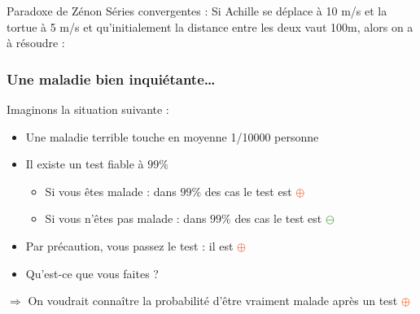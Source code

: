 \documentclass[usenames, dvipsnames]{beamer}
\newcommand{\positif}{\textcolor{OrangeRed}{$\oplus$} }
\newcommand{\negatif}{\textcolor{ForestGreen}{$\ominus$} }
\begin{document}
\begin{frame}[plain]{Paradoxe de Zénon}
{Séries convergentes :}
Si Achille se déplace à 10 m/s et la tortue à 5 m/s et qu'initialement la distance entre les deux vaut 100m, alors on a à résoudre : 
{} %
{}
\end{frame}

\begin{frame}[plain]
\frametitle{Une maladie bien inquiétante\dots}

Imaginons la situation suivante :

\begin{itemize}
\item Une maladie terrible touche en moyenne 1/10000 personne
\item Il existe un test fiable à $99\%$ \pause
\begin{itemize}
\item Si vous êtes malade : dans $99\%$ des cas le test est \positif
\item Si vous n'êtes pas malade : dans $99\%$ des cas le test est \negatif
\end{itemize}
\item Par précaution, vous passez le test : il est \positif \pause
\item Qu'est-ce que vous faites ? \pause
\end{itemize}

$\Rightarrow$ On voudrait connaître la probabilité d'être vraiment malade après un test \positif

\end{frame}
\end{document}
